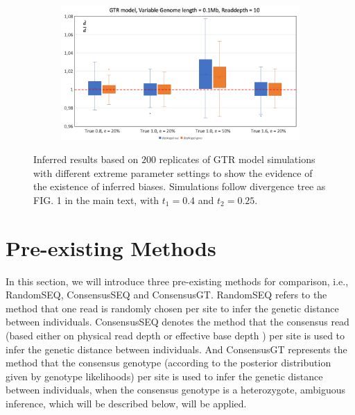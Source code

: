 \documentclass{article}
\begin{document}
\begin{figure}
\begin{subfigure}{.5\textwidth}
  \caption{}
  \label{fig:BiasGTRRD10_1M}
\end{subfigure}
\begin{subfigure}{.5\textwidth}
  \centering
  \includegraphics[width=.99\linewidth]{BiasGTRRD10_01M.png}  
  \caption{}
  \label{fig:BiasGTRRD10_01M}
\end{subfigure}
\caption{Inferred results based on $200$ replicates of GTR model simulations with different extreme parameter settings to show the evidence of the existence of inferred biases. Simulations follow divergence tree as FIG. 1 in the main text, with $t_1=0.4$ and $t_2 = 0.25$.}
\label{fig:BiasGTR}
\end{figure}

\section{Pre-existing Methods}
In this section, we will introduce three pre-existing methods for comparison, i.e., RandomSEQ, ConsensusSEQ and ConsensusGT. RandomSEQ refers to the method that one read is randomly chosen per site to infer the genetic distance between individuals. ConsensusSEQ denotes the method that the consensus read (based either on physical read depth or effective base depth \citet{Wang:2013}) per site is used to infer the genetic distance between individuals. And ConsensusGT represents the method that the consensus genotype (according to the posterior distribution given by genotype likelihoods) per site is used to infer the genetic distance between individuals, when the consensus genotype is a heterozygote, ambiguous inference, which will be described below, will be applied. 
\end{document}
